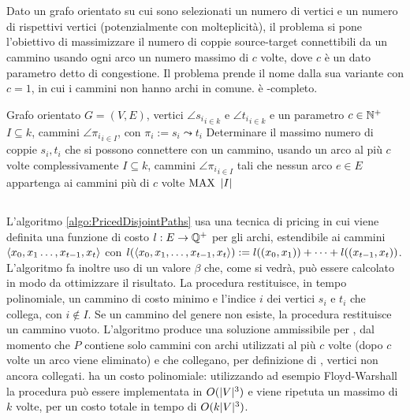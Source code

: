 \section{\DisjointPaths}
Dato un grafo orientato su cui sono selezionati un numero di vertici  e un numero di rispettivi vertici  (potenzialmente con molteplicità), il problema \DisjointPaths si pone l'obiettivo di massimizzare il numero di coppie source-target connettibili da un cammino usando ogni arco un numero massimo di $c$ volte, dove $c$ è un dato parametro detto di congestione.
Il problema prende il nome dalla sua variante con $c=1$, in cui i cammini non hanno archi in comune.
\DisjointPaths è \NPO-completo.

\popt{\DisjointPaths}
{Grafo orientato $G=(V,E)$, vertici $\angle{s_i}_{i\in k}$ e $\angle{t_i}_{i\in k}$ e un parametro $c\in\mathbb N^+$}
{$I\subseteq k$, cammini $\angle{\pi_i}_{i\in I}$, con $\pi_i:=s_i\leadsto t_i$}
{Determinare il massimo numero di coppie $s_i,t_i$ che si possono connettere con un cammino, usando un arco al più $c$ volte complessivamente}
{$I\subseteq k$, cammini $\angle{\pi_i}_{i\in I}$ tali che nessun arco $e\in E$ appartenga ai cammini più di $c$ volte}
{$\mathrm{MAX}$}
{$| I |$}


\subsection{\PricedDisjointPaths}
L'algoritmo \ref{algo:PricedDisjointPaths} usa una tecnica di pricing in cui viene definita una funzione di costo $l:E\to\mathbb Q^+$ per gli archi, estendibile ai cammini $\langle x_0,x_1\dots,x_{t-1},x_t \rangle$ con $l(\langle x_0,x_1,\dots,x_{t-1},x_t \rangle):=l((x_0,x_1))+\dots+l((x_{t-1},x_t))$.
L'algoritmo fa inoltre uso di un valore $\beta$ che, come si vedrà, può essere calcolato in modo da ottimizzare il risultato.
La procedura \MinPath restituisce, in tempo polinomiale, un cammino di costo minimo e l'indice $i$ dei vertici $s_i$ e $t_i$ che collega, con $i\notin I$. Se un cammino del genere non esiste, la procedura restituisce un cammino vuoto.
L'algoritmo produce una soluzione ammissibile per \DisjointPaths, dal momento che $P$ contiene solo cammini con archi utilizzati al più $c$ volte (dopo $c$ volte un arco viene eliminato) e che collegano, per definizione di \MinPath, vertici non ancora collegati.
\PricedDisjointPaths ha un costo polinomiale: utilizzando ad esempio Floyd-Warshall la procedura \MinPath può essere implementata in $O(| V |^3)$ e viene ripetuta un massimo di $k$ volte, per un costo totale in tempo di $O(k| V |^3)$.

